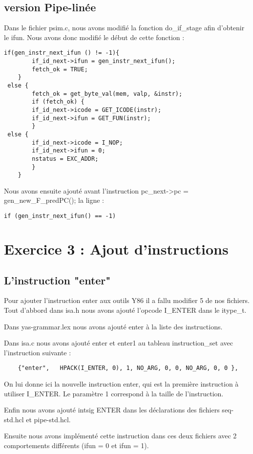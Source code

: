 \documentclass[12pt]{article}
\begin{document}
\subsection{version Pipe-linée}
Dans le fichier psim.c, nous avons modifié la fonction do\_if\_stage afin d'obtenir le ifun.
Nous avons donc modifié le début de cette fonction :
\begin{verbatim}
if(gen_instr_next_ifun () != -1){
		if_id_next->ifun = gen_instr_next_ifun();
		fetch_ok = TRUE;
	}
 else {
	    fetch_ok = get_byte_val(mem, valp, &instr);
	    if (fetch_ok) {
		if_id_next->icode = GET_ICODE(instr);
		if_id_next->ifun = GET_FUN(instr);
	    }
 else {
		if_id_next->icode = I_NOP;
		if_id_next->ifun = 0;
		nstatus = EXC_ADDR;
	    }
	}
\end{verbatim}

Nous avons ensuite ajouté avant l'instruction pc\_next->pc = gen\_new\_F\_predPC(); la ligne : 
\begin{verbatim}
if (gen_instr_next_ifun() == -1)
\end{verbatim}

\newpage
\section{Exercice 3 : Ajout d'instructions}
\subsection{L'instruction "enter"}
Pour ajouter l'instruction enter aux outils Y86 il a fallu modifier 5 de nos fichiers.
Tout d'abbord dans isa.h nous avons ajouté l'opcode I\_ENTER dans le itype\_t.

Dans yas-grammar.lex nous avons ajouté enter à la liste des instructions.

Dans isa.c nous avons ajouté enter et enter1 au tableau instruction\_set avec l'instruction suivante :
\begin{verbatim}
    {"enter",   HPACK(I_ENTER, 0), 1, NO_ARG, 0, 0, NO_ARG, 0, 0 },

\end{verbatim}

On lui donne ici la nouvelle instruction enter, qui est la première instruction à utiliser I\_ENTER. Le paramètre 1 correspond à la taille de l'instruction.

Enfin nous avons ajouté intsig ENTER dans les déclarations des fichiers seq-std.hcl et pipe-std.hcl.

Ensuite nous avons implémenté cette instruction dans ces deux fichiers avec 2 comportements différents (ifun = 0 et ifun = 1).
\end{document}
